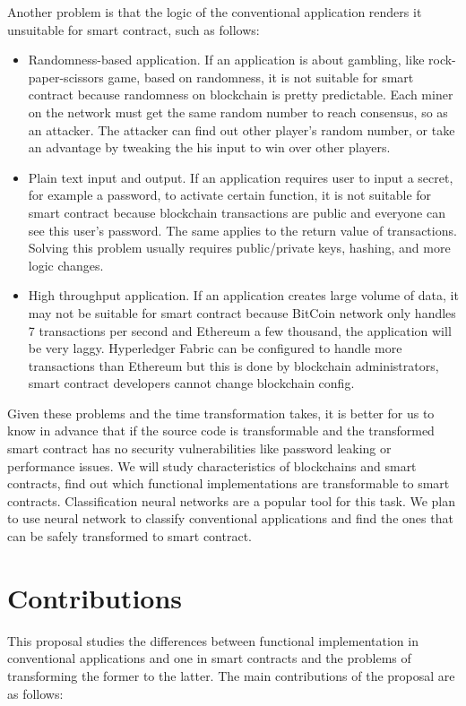 Another problem is that the logic of the conventional application renders it unsuitable for smart contract, such as follows:
\begin{itemize}
\item Randomness-based application.
If an application is about gambling, like rock-paper-scissors game, based on randomness, it is not suitable for smart contract
because randomness on blockchain is pretty predictable. Each miner on the network must get the same random number to reach consensus,
so as an attacker.
The attacker can find out other player's random number, or take an advantage by tweaking the his input to win over other players.
\item Plain text input and output.
If an application requires user to input a secret, for example a password, to activate certain function,
it is not suitable for smart contract because blockchain transactions are public and everyone can see this user's password.
The same applies to the return value of transactions.
Solving this problem usually requires public/private keys, hashing, and more logic changes.
\item High throughput application.
If an application creates large volume of data, it may not be suitable for smart contract
because BitCoin network only handles 7 transactions per second and Ethereum a few thousand, the application will be very laggy.
Hyperledger Fabric can be configured to handle more transactions than Ethereum but this is done by blockchain administrators,
smart contract developers cannot change blockchain config.
\end{itemize}




Given these problems and the time transformation takes, it is better for us to know in advance that
if the source code is transformable and the transformed smart contract has no security vulnerabilities like password leaking or performance issues.
We will study characteristics of blockchains and smart contracts, find out which functional implementations are transformable to smart contracts.
Classification neural networks are a popular tool for this task.
We plan to use neural network to classify conventional applications and find the ones that can be safely transformed to smart contract.




\section{Contributions}
This proposal studies the differences between functional implementation in conventional applications and one in smart contracts
and the problems of transforming the former to the latter.
The main contributions of the proposal are as follows:

